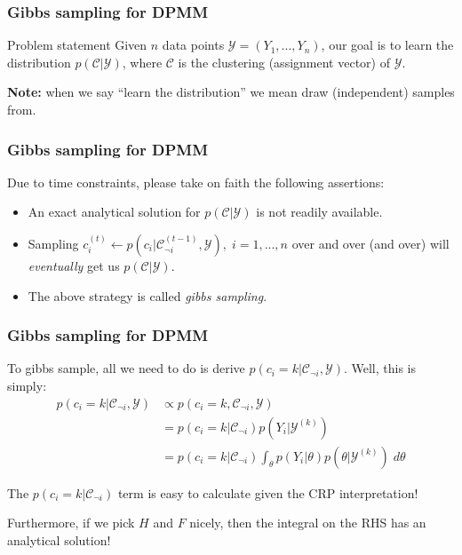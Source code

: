 \documentclass{beamer}
\newcommand{\Y}{\ensuremath{\mathcal{Y}}}
\newcommand{\C}{\ensuremath{\mathcal{C}}}
\begin{document}
\begin{frame}
\frametitle{Gibbs sampling for DPMM}
\begin{block}{Problem statement}
Given $n$ data points $\Y = (Y_1, ..., Y_n)$, our goal is to learn the
distribution $p(\C | \Y)$, where $\C$ is the clustering (assignment vector) of $\Y$.
\end{block}
\textbf{Note:} when we say ``learn the distribution'' we mean draw
(independent) samples from.
\end{frame}


\begin{frame}
\frametitle{Gibbs sampling for DPMM}
Due to time constraints, please take on faith the following assertions:
\begin{itemize}[<+->]
  \item An exact analytical solution for $p(\C | \Y)$ is not readily available.
  \item Sampling $c_i^{(t)} \gets p(c_i | \C^{(t-1)}_{\neg i}, \Y), \;
    i=1,...,n$ over and over (and over) will \emph{eventually} get us $p(\C | \Y)$.
  \item The above strategy is called \emph{gibbs sampling}.
\end{itemize}
\end{frame}


\begin{frame}
\frametitle{Gibbs sampling for DPMM}
To gibbs sample, all we need to do is derive $p(c_i{=}k | \C_{\neg i}, \Y)$. Well,
this is simply: \pause
\begin{align*}
  p(c_i{=}k | \C_{\neg i}, \Y) &\propto p(c_i{=}k, \C_{\neg i}, \Y) \\
                               &= p(c_i{=}k | \C_{\neg i}) p(Y_i | \Y^{(k)}) \\
                               &= p(c_i{=}k | \C_{\neg i}) \int_{\theta} p(Y_i | \theta) p(\theta | \Y^{(k)}) \; d\theta
\end{align*}
\pause

The $p(c_i{=}k|\C_{\neg i})$ term is easy to calculate given the CRP interpretation! \newline
\pause

Furthermore, if we pick $H$ and $F$ nicely, then the integral on the RHS has an analytical solution!
\end{frame}
\end{document}
